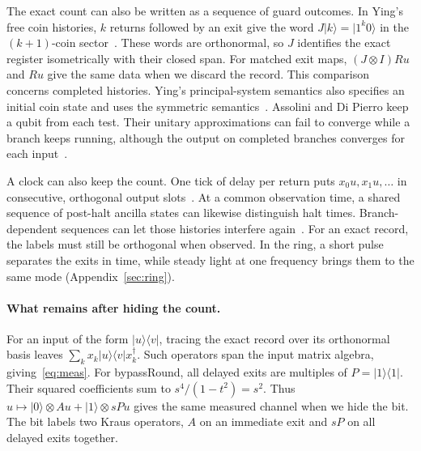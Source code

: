 \documentclass[acmsmall,screen,review,anonymous,nonacm]{acmart}
\newcommand{\storyinlineface}{\small\ttfamily}
\newcommand{\code}[1]{\textnormal{\storyinlineface #1}}
\newcommand{\ket}[1]{\lvert #1\rangle}
\newcommand{\bra}[1]{\langle #1\rvert}
\numberwithin{equation}{section}
\begin{document}
The exact count can also be written as a sequence of guard outcomes. In
Ying's free coin histories, $k$ returns followed by an exit give the word
$J\ket k=\ket{1^k0}$ in the $(k+1)$-coin sector~\cite[Eq.~(34)]{Ying14QuantumRecursion}.
These words are orthonormal, so $J$ identifies the exact register isometrically
with their closed span. For matched exit maps, $(J\otimes I)Ru$ and $Ru$ give
the same data when we discard the record. This comparison concerns completed
histories. Ying's principal-system semantics also specifies an initial coin
state and uses the symmetric semantics~\cite[Def.~9]{Ying14QuantumRecursion}.
Assolini and Di Pierro keep a qubit from each test. Their unitary approximations
can fail to converge while a branch keeps running, although the output on
completed branches converges for each input~\cite[\S~4.1, Thm.~5.9]{AssoliniDiPierro25Loops}.

A clock can also keep the count. One tick of delay per return puts
$x_0u,x_1u,\ldots$ in consecutive, orthogonal output slots~\cite[\S~3.4]{AndresMartinez22Thesis}.
At a common observation time, a shared sequence of post-halt ancilla states
can likewise distinguish halt times. Branch-dependent sequences can let those
histories interfere again~\cite{LindenPopescu98Halting}. For an exact record,
the labels must still be orthogonal when observed. In the ring, a short pulse
separates the exits in time, while steady light at one frequency brings them
to the same mode (Appendix~\ref{sec:ring}).

\paragraph{What remains after hiding the count.}
For an input of the form $\ket u\bra v$, tracing the exact record
over its orthonormal basis leaves $\sum_k x_k\ket u\bra v
x_k^\dagger$. Such operators span the input matrix algebra,
giving~\eqref{eq:meas}. For \code{bypassRound}, all delayed exits are
multiples of $P=\ket1\bra1$. Their squared coefficients sum to
$s^4/(1-t^2)=s^2$. Thus $u\mapsto\ket0\otimes Au+\ket1\otimes sPu$
gives the same measured channel when we hide the bit. The bit labels two Kraus operators, $A$ on an immediate exit and $sP$ on all delayed exits together.
\end{document}
